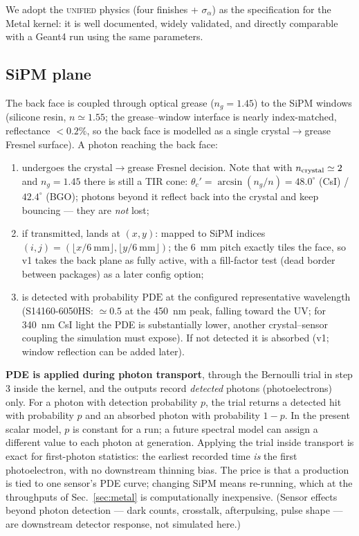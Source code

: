\documentclass[11pt,a4paper]{article}
\newcommand{\csi}{CsI}
\newcommand{\bgo}{BGO}
\begin{document}
We adopt the \textsc{unified} physics (four finishes + $\sigma_\alpha$) as the
specification for the Metal kernel: it is well documented, widely validated, and directly
comparable with a Geant4 run using the same parameters.

\subsection{SiPM plane}
\label{sec:sipm}

The back face is coupled through optical grease ($n_g = 1.45$) to the SiPM windows (silicone
resin, $n \simeq 1.55$; the grease--window interface is nearly index-matched, reflectance
$< 0.2\%$, so the back face is modelled as a single crystal$\to$grease Fresnel surface).
A photon reaching the back face:
\begin{enumerate}
  \item undergoes the crystal$\to$grease Fresnel decision. Note that with
    $n_{\rm crystal} \simeq 2$ and $n_g = 1.45$ there is still a TIR cone:
    $\theta_c' = \arcsin(n_g/n) = 48.0^\circ$ (\csi{}) / $42.4^\circ$ (\bgo{}); photons
    beyond it reflect back into the crystal and keep bouncing --- they are \emph{not} lost;
  \item if transmitted, lands at $(x, y)$: mapped to SiPM indices
    $(i,j) = (\lfloor x/6~\mathrm{mm} \rfloor, \lfloor y/6~\mathrm{mm} \rfloor)$; the 6~mm
    pitch exactly tiles the face, so v1 takes the back plane as fully active, with a
    fill-factor test (dead border between packages) as a later config option;
  \item is detected with probability $\mathrm{PDE}$ at the configured representative
    wavelength (S14160-6050HS: $\simeq 0.5$ at
    the 450~nm peak, falling toward the UV; for 340~nm \csi{} light the PDE is substantially
    lower, another crystal--sensor coupling the simulation must expose). If not detected it
    is absorbed (v1; window reflection can be added later).
\end{enumerate}
\textbf{PDE is applied during photon transport}, through the Bernoulli trial in step 3
inside the kernel, and the outputs record \emph{detected} photons (photoelectrons) only.
For a photon with detection probability $p$, the trial returns a detected hit with
probability $p$ and an absorbed photon with probability $1-p$. In the present scalar
model, $p$ is constant for a run; a future spectral model can assign a different value
to each photon at generation. Applying the trial inside transport is exact for
first-photon statistics: the earliest recorded time \emph{is} the
first photoelectron, with no downstream thinning bias. The price is that a production is
tied to one sensor's PDE curve; changing SiPM means re-running, which at the throughputs of
Sec.~\ref{sec:metal} is computationally inexpensive. (Sensor effects beyond photon detection --- dark counts,
crosstalk, afterpulsing, pulse shape --- are downstream detector response, not simulated
here.)
\end{document}
